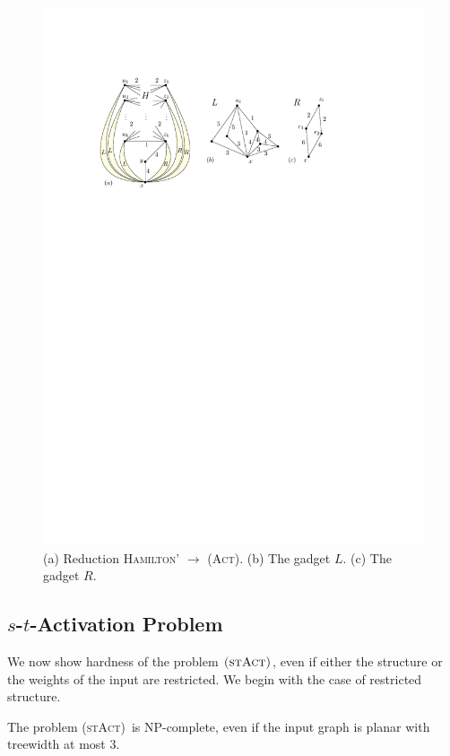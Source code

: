 \documentclass[runningheads]{llncs}
\numberwithin{equation}{section}
\newcommand{\act}{\textsc{(Act)}}
\newcommand{\stact}{\textsc{(stAct)}}
\begin{document}
\begin{figure}[htpb]
\centering
\includegraphics[scale=1]{img/act-hamilton-cycle}
\caption{(a) Reduction \textsc{Hamilton'} $\rightarrow$ \act. (b) The gadget $L$. (c) The gadget $R$.}
\label{fig_act_hamilton_cycle}
\end{figure}


\subsection{$s$-$t$-Activation Problem}
We now show hardness of the problem $\stact$, even if either the structure or the weights of the input are restricted. We begin with the case of restricted structure.

\begin{theorem}
\label{thm_stact_np_hard}
The problem \stact\ is NP-complete, even if the input graph is planar with treewidth at most 3.
\end{theorem}
\end{document}
